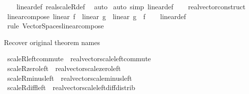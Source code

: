 \begin{isabellebody}
\ \ \isamarkupfalse%
\ linear{\isacharunderscore}{\kern0pt}def\ real{\isacharunderscore}{\kern0pt}scaleR{\isacharunderscore}{\kern0pt}def\ \isamarkupfalse%
\ auto\isanewline
{}\isamarkupfalse%
\ {\isacharparenleft}{\kern0pt}auto\ simp{\isacharcolon}{\kern0pt}\ linear{\isacharunderscore}{\kern0pt}def{\isacharparenright}{\kern0pt}%
\endisatagproof
{\isafoldproof}%
%
\isadelimproof
\isanewline
%
\endisadelimproof
\isanewline
{}\isamarkupfalse%
\ {\isacharparenleft}{\kern0pt}%
\isanewline
\ \ real{\isacharunderscore}{\kern0pt}vector{\isachardot}{\kern0pt}construct\isanewline
\isanewline
{}\isamarkupfalse%
\ linear{\isacharunderscore}{\kern0pt}compose{\isacharcolon}{\kern0pt}\ {\isachardoublequoteopen}linear\ f\ {\isasymLongrightarrow}\ linear\ g\ {\isasymLongrightarrow}\ linear\ {\isacharparenleft}{\kern0pt}g\ {\isasymcirc}\ f{\isacharparenright}{\kern0pt}{\isachardoublequoteclose}\isanewline
%
\isadelimproof
\ \ %
\endisadelimproof
%
\isatagproof
{}\isamarkupfalse%
\ linear{\isacharunderscore}{\kern0pt}def\ \isamarkupfalse%
\ {\isacharparenleft}{\kern0pt}rule\ Vector{\isacharunderscore}{\kern0pt}Spaces{\isachardot}{\kern0pt}linear{\isacharunderscore}{\kern0pt}compose{\isacharparenright}{\kern0pt}%
\endisatagproof
{\isafoldproof}%
%
\isadelimproof
%
\endisadelimproof
%
\begin{isamarkuptext}%
Recover original theorem names%
\end{isamarkuptext}\isamarkuptrue%
\isamarkupfalse%
\ scaleR{\isacharunderscore}{\kern0pt}left{\isacharunderscore}{\kern0pt}commute\ {\isacharequal}{\kern0pt}\ real{\isacharunderscore}{\kern0pt}vector{\isachardot}{\kern0pt}scale{\isacharunderscore}{\kern0pt}left{\isacharunderscore}{\kern0pt}commute\isanewline
{}\isamarkupfalse%
\ scaleR{\isacharunderscore}{\kern0pt}zero{\isacharunderscore}{\kern0pt}left\ {\isacharequal}{\kern0pt}\ real{\isacharunderscore}{\kern0pt}vector{\isachardot}{\kern0pt}scale{\isacharunderscore}{\kern0pt}zero{\isacharunderscore}{\kern0pt}left\isanewline
{}\isamarkupfalse%
\ scaleR{\isacharunderscore}{\kern0pt}minus{\isacharunderscore}{\kern0pt}left\ {\isacharequal}{\kern0pt}\ real{\isacharunderscore}{\kern0pt}vector{\isachardot}{\kern0pt}scale{\isacharunderscore}{\kern0pt}minus{\isacharunderscore}{\kern0pt}left\isanewline
{}\isamarkupfalse%
\ scaleR{\isacharunderscore}{\kern0pt}diff{\isacharunderscore}{\kern0pt}left\ {\isacharequal}{\kern0pt}\ real{\isacharunderscore}{\kern0pt}vector{\isachardot}{\kern0pt}scale{\isacharunderscore}{\kern0pt}left{\isacharunderscore}{\kern0pt}diff{\isacharunderscore}{\kern0pt}distrib\isanewline

\end{isabellebody}
